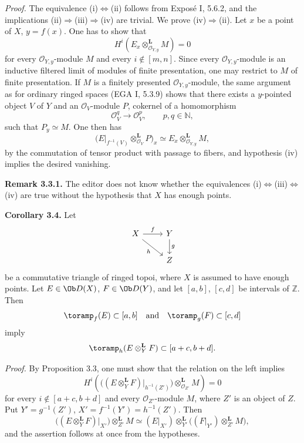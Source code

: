 \emph{Proof.} The equivalence (i)\(\Longleftrightarrow\)(ii) follows from Exposé I, 5.6.2, and the implications (ii)\(\Rightarrow\)(iii)\(\Rightarrow\)(iv) are trivial. We prove (iv)\(\Rightarrow\)(ii). Let \(x\) be a point of \(X\), \(y=f(x)\). One has to show that
\[
  H^i(E_x\otimes_{\mathcal O_{Y,y}}^{\mathbf L}M)=0
\]
for every \(\mathcal O_{Y,y}\)-module \(M\) and every \(i\notin[m,n]\). Since every \(\mathcal O_{Y,y}\)-module is an inductive filtered limit of modules of finite presentation, one may restrict to \(M\) of finite presentation. If \(M\) is a finitely presented \(\mathcal O_{Y,y}\)-module, the same argument as for ordinary ringed spaces (EGA I, 5.3.9) shows that there exists a \(y\)-pointed object \(V\) of \(Y\) and an \(\mathcal O_V\)-module \(P\), cokernel of a homomorphism
\[
  \mathcal O_V^q\longrightarrow\mathcal O_V^p,
  \qquad p,q\in\mathbb N,
\]
such that \(P_y\simeq M\). One then has
\[
  \bigl(E\vert_{f^{-1}(V)}\otimes_{\mathcal O_V}^{\mathbf L}P\bigr)_x
  \simeq
  E_x\otimes_{\mathcal O_{Y,y}}^{\mathbf L}M,
\]
by the commutation of tensor product with passage to fibers, and hypothesis (iv) implies the desired vanishing.

\textbf{Remark 3.3.1.} The editor does not know whether the equivalences (i)\(\Longleftrightarrow\)(iii)\(\Longleftrightarrow\)(iv) are true without the hypothesis that \(X\) has enough points.

\textbf{Corollary 3.4.} Let
\[
\begin{tikzcd}
X \arrow[r,"f"] \arrow[dr,"h"'] & Y \arrow[d,"g"]\\
& Z
\end{tikzcd}
\]
be a commutative triangle of ringed topoi, where \(X\) is assumed to have enough points. Let \(E\in\Ob D(X)\), \(F\in\Ob D(Y)\), and let \([a,b]\), \([c,d]\) be intervals of \(\mathbb Z\). Then
\[
  \toramp_f(E)\subset[a,b]\quad\text{and}\quad \toramp_g(F)\subset[c,d]
\]
imply
\[
  \toramp_h(E\otimes_Y^{\mathbf L}F)\subset[a+c,b+d].
\]

\emph{Proof.} By Proposition 3.3, one must show that the relation on the left implies
\[
  H^i\left(\bigl((E\otimes_Y^{\mathbf L}F)\vert_{h^{-1}(Z')}\bigr)
    \otimes_{\mathcal O_{Z'}}^{\mathbf L}M\right)=0
\]
for every \(i\notin[a+c,b+d]\) and every \(\mathcal O_{Z'}\)-module \(M\), where \(Z'\) is an object of \(Z\). Put \(Y'=g^{-1}(Z')\), \(X'=f^{-1}(Y')=h^{-1}(Z')\). Then
\[
  \bigl((E\otimes_Y^{\mathbf L}F)\vert_{X'}\bigr)\otimes_{Z'}^{\mathbf L}M
  \simeq
  (E\vert_{X'})\otimes_{Y'}^{\mathbf L}\bigl((F\vert_{Y'})\otimes_{Z'}^{\mathbf L}M\bigr),
\]
and the assertion follows at once from the hypotheses.

